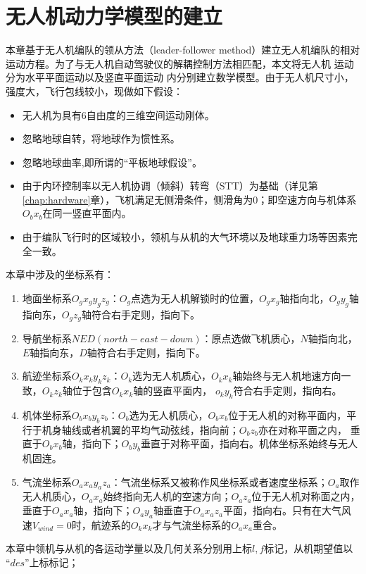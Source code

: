\chapter{无人机动力学模型的建立}
\label{chap:formation_dynamic_equ}
本章基于无人机编队的领从方法（leader-follower method）建立无人机编队的相对运动方程。为了与无人机自动驾驶仪的解耦控制方法相匹配，本文将无人机
运动分为水平平面运动以及竖直平面运动
内分别建立数学模型。由于无人机尺寸小，强度大，飞行包线较小，现做如下假设：
\begin{itemize}
    \item 无人机为具有6自由度的三维空间运动刚体。
    \item 忽略地球自转，将地球作为惯性系。
    \item 忽略地球曲率,即所谓的“平板地球假设”。%
    \item 由于内环控制率以无人机协调（倾斜）转弯（STT）为基础（详见第\ref{chap:hardware}章），飞机满足无侧滑条件，侧滑角为0；即空速方向与机体系$O_bx_b$在同一竖直平面内。
    \item 由于编队飞行时的区域较小，领机与从机的大气环境以及地球重力场等因素完全一致。
\end{itemize}
本章中涉及的坐标系有：
\begin{enumerate}
    \item 地面坐标系$O_gx_gy_gz_g$：$O_g$点选为无人机解锁时的位置，$O_gx_g$轴指向北，$O_gy_g$轴指向东，$O_gz_g$轴符合右手定则，指向下。
    \item 导航坐标系$NED(north-east-down)$：原点选做飞机质心，$N$轴指向北，$E$轴指向东，$D$轴符合右手定则，指向下。
    \item 航迹坐标系$O_kx_ky_kz_k$：$O_k$选为无人机质心，$O_kx_k$轴始终与无人机地速方向一致，$O_kz_k$轴位于包含$O_kx_k$轴的竖直平面内，
    $o_ky_k$符合右手定则，指向右。
    \item 机体坐标系$O_bx_by_bz_b$：$O_b$选为无人机质心，$O_bx_b$位于无人机的对称平面内，平行于机身轴线或者机翼的平均气动弦线，指向前；$O_bz_b$亦在对称平面之内，
    垂直于$O_bx_b$轴，指向下；$O_by_b$垂直于对称平面，指向右。机体坐标系始终与无人机固连。
    \item 气流坐标系$O_ax_ay_az_a$：气流坐标系又被称作风坐标系或者速度坐标系；$O_a$取作无人机质心，$O_ax_a$始终指向无人机的空速方向；$O_az_a$位于无人机对称面之内，
    垂直于$O_ax_a$轴，指向下；$O_ay_a$轴垂直于$O_ax_az_a$平面，指向右。只有在大气风速$V_{wind}=0$时，航迹系的$O_kx_k$才与气流坐标系的$O_ax_a$重合。
\end{enumerate}
本章中领机与从机的各运动学量以及几何关系分别用上标$l,f$标记，从机期望值以$“des”$上标标记；
